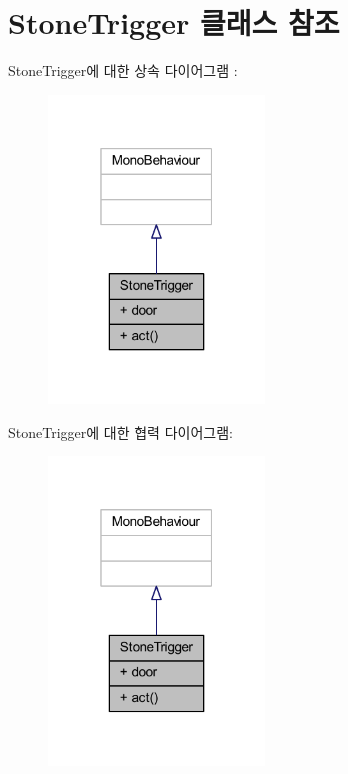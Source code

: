 \hypertarget{class_stone_trigger}{}\section{Stone\+Trigger 클래스 참조}
\label{class_stone_trigger}


Stone\+Trigger에 대한 상속 다이어그램 \+: \nopagebreak
\begin{figure}[H]
\begin{center}
\leavevmode
\includegraphics[width=163pt]{d7/d3f/class_stone_trigger__inherit__graph}
\end{center}
\end{figure}


Stone\+Trigger에 대한 협력 다이어그램\+:\nopagebreak
\begin{figure}[H]
\begin{center}
\leavevmode
\includegraphics[width=163pt]{d7/d99/class_stone_trigger__coll__graph}
\end{center}
\end{figure}
